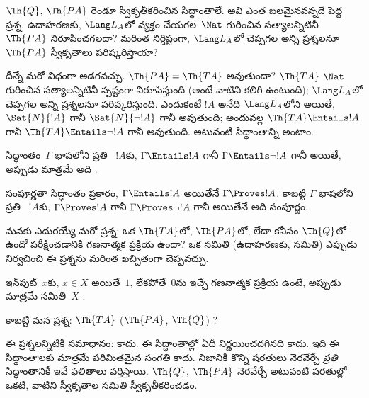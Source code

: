 \documentclass[../../../include/open-logic-section]{subfiles}
\begin{document}
$\Th{Q}$, $\Th{PA}$ రెండూ స్వీకృతీకరించిన సిద్ధాంతాలే. అవి ఎంత బలమైనవన్నదే
పెద్ద ప్రశ్న. ఉదాహరణకు, $\Lang L_A$లో వ్యక్తం చేయగల~$\Nat$ గురించిన సత్యాలన్నిటినీ
$\Th{PA}$ నిరూపించగలదా? మరింత నిర్దిష్టంగా, $\Lang L_A$లో చెప్పగల అన్ని
ప్రశ్నలనూ $\Th{PA}$ స్వీకృతాలు పరిష్కరిస్తాయా?

దీన్నే మరో విధంగా అడగవచ్చు. $\Th{PA}=\Th{TA}$ అవుతుందా? $\Th{TA}$
$\Nat$ గురించిన సత్యాలన్నిటినీ స్పష్టంగా నిరూపిస్తుంది (అంటే వాటిని కలిగి ఉంటుంది);
$\Lang L_A$లో చెప్పగల అన్ని ప్రశ్నలనూ పరిష్కరిస్తుంది. ఎందుకంటే $!A$ అనేది
$\Lang L_A$లోని  అయితే, $\Sat{N}{!A}$ గానీ
$\Sat{N}{\lnot !A}$ గానీ అవుతుంది; అందువల్ల $\Th{TA}\Entails !A$ గానీ
$\Th{TA}\Entails \lnot !A$ గానీ అవుతుంది. అటువంటి సిద్ధాంతాన్ని
\emph{} అంటాం.

\begin{defn}
సిద్ధాంతం~$\Gamma$ భాషలోని ప్రతి ~$!A$కు,
$\Gamma \Entails !A$ గానీ $\Gamma \Entails \lnot !A$ గానీ అయితే, అప్పుడు
మాత్రమే అది \emph{}.
\end{defn}

\begin{explain}
సంపూర్ణతా సిద్ధాంతం ప్రకారం, $\Gamma \Entails !A$ అయితేనే $\Gamma \Proves !A$.
కాబట్టి $\Gamma$ భాషలోని ప్రతి ~$!A$కు,
$\Gamma \Proves !A$ గానీ $\Gamma \Proves \lnot !A$ గానీ అయితేనే అది
సంపూర్ణం.
\end{explain}

మనకు ఎదురయ్యే మరో ప్రశ్న: ఒక  $\Th{TA}$లో,
$\Th{PA}$లో, లేదా కనీసం $\Th{Q}$లో ఉందో పరీక్షించడానికి గణనాత్మక ప్రక్రియ
ఉందా? ఒక సమితి (ఉదాహరణకు,  సమితి) ఎప్పుడు
 నిర్వచించి ఈ ప్రశ్నను మరింత ఖచ్చితంగా
చెప్పవచ్చు.

\begin{defn}
ఇన్‌పుట్~$x$కు, $x \in X$ అయితే~$1$, లేకపోతే~$0$ను ఇచ్చే గణనాత్మక ప్రక్రియ
ఉంటే, అప్పుడు మాత్రమే సమితి~$X$ \emph{}.
\end{defn}

కాబట్టి మన ప్రశ్న: $\Th{TA}$ ($\Th{PA}$, $\Th{Q}$)
?

ఈ ప్రశ్నలన్నిటికీ సమాధానం: కాదు. ఈ సిద్ధాంతాల్లో ఏదీ నిర్ణయించదగినది కాదు.
ఇది ఈ సిద్ధాంతాలకు మాత్రమే పరిమితమైన సంగతి కాదు. నిజానికి కొన్ని షరతులు
నెరవేర్చే \emph{ప్రతి} సిద్ధాంతానికీ ఇవే ఫలితాలు వర్తిస్తాయి. $\Th{Q}$,
$\Th{PA}$ నెరవేర్చే అటువంటి షరతుల్లో ఒకటి, వాటిని
 స్వీకృతాల సమితి స్వీకృతీకరించడం.
\end{document}
